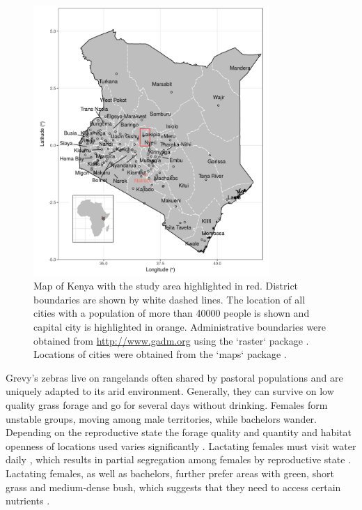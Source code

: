 \documentclass[12pt,a4paper, twoside, english]{article}
\begin{document}
\begin{figure}[H]
  \centering
  \includegraphics[width=0.8\textwidth]{figures/Studyarea_KEN.png}
  \caption[Map of Kenya]{Map of Kenya with the study area highlighted in red. District boundaries are shown by white dashed lines. The location of all cities with a population of more than 40000 people is shown and capital city is highlighted in orange. Administrative boundaries were obtained from \url{http://www.gadm.org} using the `raster` package \citep{Bivand2016a}. Locations of cities were obtained from the `maps` package \citep{Becker2016}.}
  \label{fig:studyarea_ken}
\end{figure}

Grevy's zebras live on rangelands often shared by pastoral populations and are uniquely adapted to its arid environment. Generally, they can survive on low quality grass forage and go for several days without drinking. Females form unstable groups, moving among male territories, while bachelors wander. Depending on the reproductive state the forage quality and quantity and habitat openness of locations used varies significantly \citep{Sundaresan2008}. Lactating females must visit water daily \citep{Sundaresan2012}, which results in partial segregation among females by reproductive state \citep{Sundaresan2007}. Lactating females, as well as bachelors, further prefer areas with green, short grass and medium-dense bush, which suggests that they need to access certain nutrients \citep{Sundaresan2008}.
\end{document}
